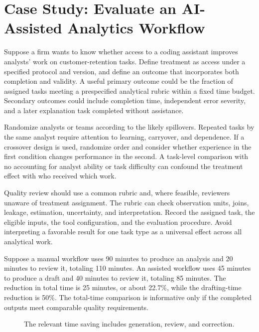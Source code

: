 \hypertarget{M08-case-study-evaluate-an-ai-assisted-analytics-workflow}{%
\section{Case Study: Evaluate an AI-Assisted Analytics
Workflow}\label{M08-case-study-evaluate-an-ai-assisted-analytics-workflow}}

\noindent Suppose a firm wants to know whether access to a coding assistant
improves analysts' work on customer-retention tasks. Define treatment as
access under a specified protocol and version, and define an outcome
that incorporates both completion and validity. A useful primary outcome
could be the fraction of assigned tasks meeting a prespecified
analytical rubric within a fixed time budget. Secondary outcomes could
include completion time, independent error severity, and a later
explanation task completed without assistance.

Randomize analysts or teams according to the likely spillovers. Repeated
tasks by the same analyst require attention to learning, carryover, and
dependence. If a crossover design is used, randomize order and consider
whether experience in the first condition changes performance in the
second. A task-level comparison with no accounting for analyst ability
or task difficulty can confound the treatment effect with who received
which work.

Quality review should use a common rubric and, where feasible, reviewers
unaware of treatment assignment. The rubric can check observation units,
joins, leakage, estimation, uncertainty, and interpretation. Record the
assigned task, the eligible inputs, the tool configuration, and the
evaluation procedure. Avoid interpreting a favorable result for one task
type as a universal effect across all analytical work.

Suppose a manual workflow uses 90 minutes to produce an analysis and 20
minutes to review it, totaling 110 minutes. An assisted workflow uses 45
minutes to produce a draft and 40 minutes to review it, totaling 85
minutes. The reduction in total time is 25 minutes, or about 22.7\%,
while the drafting-time reduction is 50\%. The total-time comparison is
informative only if the completed outputs meet comparable quality
requirements.

\begin{figure}[htbp]
\centering

\caption{The relevant time saving includes generation, review, and correction.}\label{fig:M08_workflow_time}
\end{figure}

